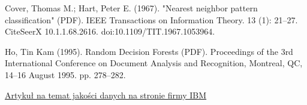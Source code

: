 \documentclass{book}
\begin{document}
\begin{thebibliography}{9}
    Cover, Thomas M.; Hart, Peter E. (1967). "Nearest neighbor pattern classification" (PDF). IEEE Transactions on Information Theory. 13 (1): 21–27. CiteSeerX 10.1.1.68.2616. doi:10.1109/TIT.1967.1053964.

    Ho, Tin Kam (1995). Random Decision Forests (PDF). Proceedings of the 3rd International Conference on Document Analysis and Recognition, Montreal, QC, 14–16 August 1995. pp. 278–282.

    \href{https://www.ibm.com/topics/data-quality}{Artykuł na temat jakości danych na stronie firmy IBM}
    

\end{thebibliography}

    
\end{document}

